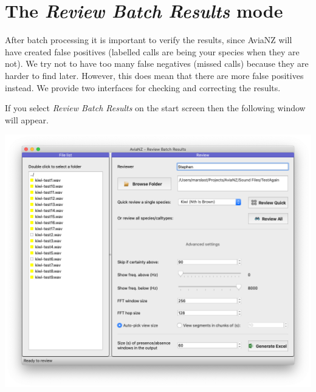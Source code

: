 \documentclass{scrartcl}
\begin{document}
\section{The \textit{Review Batch Results} mode}\label{sec:review}

After batch processing it is important to verify the results, since AviaNZ will have created false positives (labelled calls are being your species when they are not). We try not to have too many false negatives (missed calls) because they are harder to find later. However, this does mean that there are more false positives instead. We provide two interfaces for checking and correcting the results. 

If you select \textit{Review Batch Results} on the start screen then the following window will appear.

\begin{center}
	\includegraphics[width=.95\textwidth]{Figures/BatchReview1}
\end{center}
\end{document}
